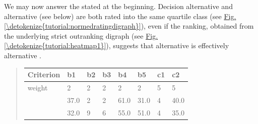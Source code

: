\documentclass[a4paper,12pt,english]{sphinxhowto}
\begin{document}
We may now answer the  stated at the beginning. Decision alternative  and alternative  (see below) are both rated into the same quartile  class (see \hyperref[\detokenize{tutorial:normedratingdigraph}]{Fig.\@ \ref{\detokenize{tutorial:normedratingdigraph}}}), even if the  ranking, obtained from the underlying strict outranking digraph (see \hyperref[\detokenize{tutorial:heatmap1}]{Fig.\@ \ref{\detokenize{tutorial:heatmap1}}}), suggests that alternative  is effectively  alternative .
\begin{quote}


\begin{savenotes}\sphinxattablestart
\centering
\begin{tabulary}{\linewidth}[t]{|T|T|T|T|T|T|T|T|}
\hline
\sphinxstyletheadfamily 
Criterion
&\sphinxstyletheadfamily 
b1
&\sphinxstyletheadfamily 
b2
&\sphinxstyletheadfamily 
b3
&\sphinxstyletheadfamily 
b4
&\sphinxstyletheadfamily 
b5
&\sphinxstyletheadfamily 
c1
&\sphinxstyletheadfamily 
c2
\\
\hline
weight
&
2
&
2
&
2
&
2
&
2
&
5
&
5
\\
\hline
{}
&
37.0
&
2
&
2
&
61.0
&
31.0
&
\sphinxhyphen{}4
&
\sphinxhyphen{}40.0
\\
\hline
{}
&
32.0
&
9
&
6
&
55.0
&
51.0
&
\sphinxhyphen{}4
&
\sphinxhyphen{}35.0
\\
\hline
\end{tabulary}
\par
\sphinxattableend\end{savenotes}
\end{quote}
\end{document}

